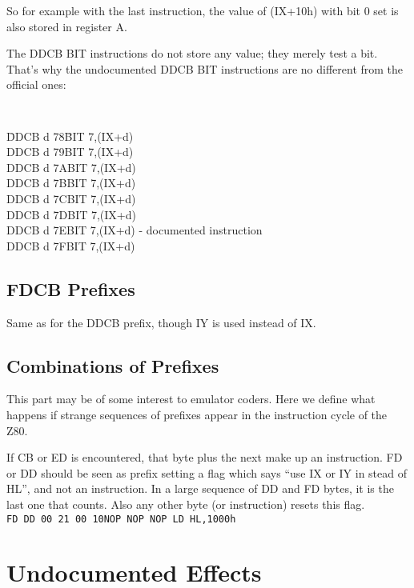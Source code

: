 \documentclass[oneside,a4paper]{book}
\begin{document}
So for example with the last instruction, the value of (IX+10h) with bit 0 
set is also stored in register A.

The DDCB BIT instructions do not store any value; they merely test a bit.
That's why the undocumented DDCB BIT instructions are no different from
the official ones:

{\tt
  \begin{tabbing}
    {\qquad}\=DDCB d 78{\qquad}\=BIT 7,(IX+d)\+\\
    DDCB d 79\>BIT 7,(IX+d)\\
    DDCB d 7A\>BIT 7,(IX+d)\\
    DDCB d 7B\>BIT 7,(IX+d)\\
    DDCB d 7C\>BIT 7,(IX+d)\\
    DDCB d 7D\>BIT 7,(IX+d)\\
    DDCB d 7E\>BIT 7,(IX+d) {\rm - documented instruction}\\
    DDCB d 7F\>BIT 7,(IX+d)
  \end{tabbing}
}


\section{FDCB Prefixes}

Same as for the DDCB prefix, though IY is used instead of IX.


\section{Combinations of Prefixes}

This part may be of some interest to emulator coders. Here we define
what happens if strange sequences of prefixes appear in the instruction
cycle of the Z80.

If CB or ED is encountered, that byte plus the next make up an instruction.
FD or DD should be seen as prefix setting a flag which says ``use IX or IY in
stead of HL'', and not an instruction. In a large sequence of DD and FD
bytes, it is the last one that counts. Also any other byte (or instruction)
resets this flag. \\[0.5ex]

{\tt {\qquad}FD DD 00 21 00 10{\qquad}NOP NOP NOP LD HL,1000h}




\chapter{Undocumented Effects}
\end{document}
